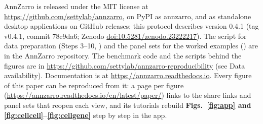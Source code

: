 AnnZarro is released under the MIT license at \url{https://github.com/settylab/annzarro}, on PyPI as annzarro, and as standalone desktop applications on GitHub releases; this protocol describes version 0.4.1 (tag v0.4.1, commit 78c9da6; Zenodo \href{https://doi.org/10.5281/zenodo.23222217}{doi:10.5281/zenodo.23222217}). The script for data preparation (Steps 3--10, ) and the panel sets for the worked examples () are in the AnnZarro repository. The benchmark code and the scripts behind the figures are in \url{https://github.com/settylab/annzarro-reproducibility} (see Data availability). Documentation is at \url{https://annzarro.readthedocs.io}. Every figure of this paper can be reproduced from it: a page per figure (\url{https://annzarro.readthedocs.io/en/latest/paper/}) links to the share links and panel sets that reopen each view, and its tutorials rebuild \textbf{Figs.~\ref{fig:app} and \ref{fig:cellcell}--\ref{fig:cellgene}} step by step in the app.

